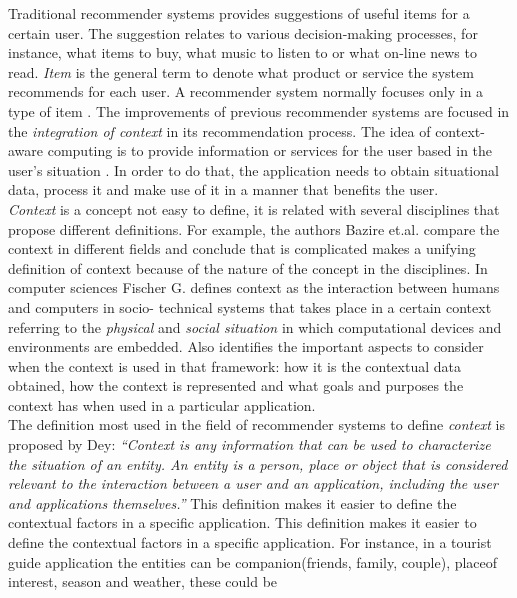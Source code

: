 Traditional recommender systems provides suggestions of useful items
for a certain user. The suggestion relates to various  decision-making
processes, for instance, what items to buy, what music to listen to or
what on-line news to read. \textit{Item} is the general term to denote
what product or service the system recommends for each user. A
recommender system normally focuses only in a type of item
\cite{resnick1997recommender}.
The improvements of previous recommender systems are focused in the
\textit{integration of context} in its recommendation process. 
The idea of context-aware computing is to provide
information or services for the user based in the user’s situation
\cite{dey2001understanding}. In order to do that, the application 
needs to obtain situational data, process it and make use of it 
in a manner that benefits the user. \\ 
\textit{Context} is a concept not easy to define, it is related with
several disciplines that propose different definitions. For example,
the authors Bazire et.al.\cite{bazire2005understanding} compare the
context in different fields and conclude that is complicated makes a
unifying definition of context because of the nature of the concept in
the disciplines. In computer sciences Fischer
G.\cite{fischer2012context} defines context as the interaction between
humans and computers in socio- technical systems that takes place in a
certain context referring to the \textit{physical} and \textit{social
situation} in which  computational devices and environments are
embedded. Also identifies the important aspects to consider when the
context is used in that framework: how it is the contextual data
obtained, how the context is represented and what goals and purposes
the context has when used in a particular application. \\
The definition most used in the field of recommender systems to
define \textit{context} is proposed by Dey\cite{dey2001understanding}:
\textit{``Context is any information that can be used to characterize
the situation of an entity. An entity is a person, place or object
that is considered relevant to the interaction between a user and  an
application, including the user and applications themselves.''}  This
definition makes it easier to define the contextual factors in a
specific application. This definition makes it easier to define the
contextual factors in a specific application. For instance, in a
tourist guide application the entities can be companion(friends,
family, couple), placeof interest, season and weather, these could be
